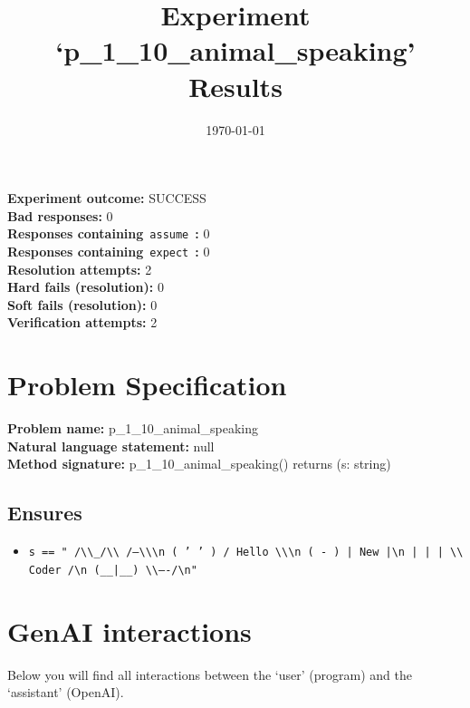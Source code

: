 \documentclass{article}
\begin{document}
\title{Experiment `p\_1\_10\_animal\_speaking' Results}
\author{\today}
\date{}
\maketitle
\textbf{Experiment outcome: }SUCCESS
\\\textbf{Bad responses: }0
\\\textbf{Responses containing}~\texttt{assume}~\textbf{: }0
\\\textbf{Responses containing}~\texttt{expect}~\textbf{: }0
\\\textbf{Resolution attempts: }2
\\\textbf{Hard fails (resolution): }0
\\\textbf{Soft fails (resolution): }0
\\\textbf{Verification attempts: }2
\section*{Problem Specification}
\textbf{Problem name: }p\_1\_10\_animal\_speaking
\\\textbf{Natural language statement: }null
\\\textbf{Method signature: }p\_1\_10\_animal\_speaking() returns (s: string)
\subsection*{Ensures}
\begin{itemize}
\item \texttt{s == "  /\textbackslash{}\textbackslash{}\_/\textbackslash{}\textbackslash{}     /---\textbackslash{}\textbackslash{}\textbackslash{}n ( ' ' )  / Hello \textbackslash{}\textbackslash{}\textbackslash{}n (  -  )  |  New  |\textbackslash{}n  | | |   \textbackslash{}\textbackslash{} Coder /\textbackslash{}n (\_\_|\_\_)    \textbackslash{}\textbackslash{}----/\textbackslash{}n"}
\end{itemize}
\clearpage
\section*{GenAI interactions}
Below you will find all interactions between the `user' (program) and the `assistant' (OpenAI).
\end{document}
